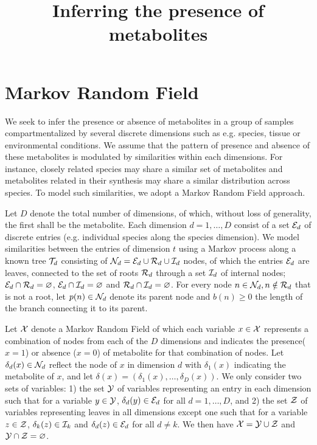 \documentclass[a4paper,12pt]{article}
\title{Inferring the presence of metabolites}
\def\E{\mathbb{E}}
\def\E{{\cal E}}
\def\I{{\cal I}}
\def\N{{\cal N}}
\def\R{{\cal R}}
\def\T{{\cal T}}
\def\X{{\cal X}}
\def\Y{{\cal Y}}
\def\Z{{\cal Z}}
\begin{document}
\maketitle

\section{Markov Random Field}
We seek to infer the presence or absence of metabolites in a group of samples compartmentalized by several discrete dimensions such as e.g. species, tissue or environmental conditions. We assume that the pattern of presence and absence of these metabolites is modulated by similarities within each dimensions. For instance, closely related species may share a similar set of metabolites and  metabolites related in their synthesis may share a similar distribution across species. To model such similarities, we adopt a Markov Random Field approach.

Let $D$ denote the total number of dimensions, of which, without loss of generality, the first shall be the metabolite. Each dimension $d=1, \ldots, D$ consist of a set $\E_d$ of discrete entries (e.g. individual species along the species dimension). We model similarities between the entries of dimension $t$ using a Markov process along a known tree $\T_d$ consisting of $\N_d = \E_d \cup \R_d \cup \I_d$ nodes, of which the entries $\E_d$ are leaves, connected to the set of roots $\R_d$ through a set $\I_d$ of internal nodes; $\E_d \cap \R_d = \varnothing$, $\E_d \cap \I_d = \varnothing$ and $\R_d \cap \I_d = \varnothing$. For every node $n \in \N_d, n \notin \R_d$ that is not a root, let $p(n) \in \N_d$ denote its parent node and $b(n) \geq 0$ the length of the branch connecting it to its parent.

Let $\X$ denote a Markov Random Field of which each variable $x \in \X$ represents a combination of nodes from each of the $D$ dimensions and indicates the presence($x=1$) or absence ($x=0$) of metabolite for that combination of nodes. Let $\delta_d(x) \in \N_d$ reflect the node of $x$ in dimension $d$ with $\delta_1(x)$ indicating the metabolite of $x$, and let $\delta(x)=(\delta_1(x), \ldots, \delta_D(x))$. We only consider two sets of variables: 1) the set $\Y$ of variables representing an entry in each dimension such that for a variable $y\in\Y$, $\delta_d(y) \in \E_d$ for all $d=1, \ldots, D$, and 2) the set $\Z$ of variables representing leaves in all dimensions except one such that for a variable $z \in \Z$, $\delta_k(z) \in \I_k$ and $\delta_d(z) \in \E_d$ for all $d \neq k$. We then have $\X = \Y \cup \Z$ and $\Y \cap \Z = \varnothing$.
\end{document}
